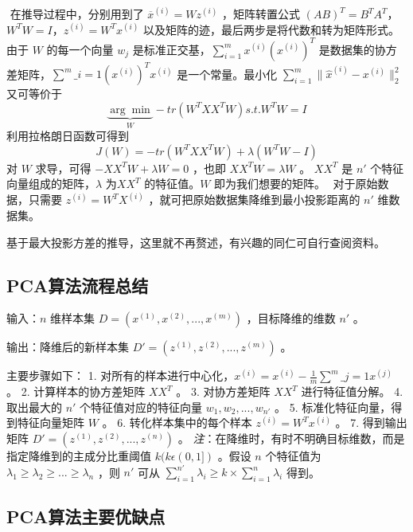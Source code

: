 ​ 在推导过程中，分别用到了 $\overline{x}^{(i)} = Wz^{(i)}$
，矩阵转置公式
$(AB)^T = B^TA^T$，$W^TW = I$，$z^{(i)} = W^Tx^{(i)}$
以及矩阵的迹，最后两步是将代数和转为矩阵形式。 ​ 由于 $W$ 的每一个向量
$w_j$ 是标准正交基，$\sum^m_{i=1} x^{(i)} \left( x^{(i)} \right)^T$
是数据集的协方差矩阵，$\sum^m\_{i=1} \left( x^{(i)}
\right)^T x^{(i)} $ 是一个常量。最小化
$\sum^m_{i=1} \| \hat{x}^{(i)} - x^{(i)} \|^2_2$ 又可等价于 \[
\underbrace{\arg \min}_W - tr \left( W^TXX^TW \right) s.t.W^TW = I
\] 利用拉格朗日函数可得到 \[
J(W) = -tr(W^TXX^TW) + \lambda(W^TW - I)
\] ​ 对 $W$ 求导，可得 $-XX^TW + \lambda W = 0 $ ，也即 $
XX^TW = \lambda W $ 。 $ XX^T $ 是 $ n' $
个特征向量组成的矩阵，$\lambda$ 为$ XX^T $ 的特征值。$W$
即为我们想要的矩阵。 ​ 对于原始数据，只需要 $z^{(i)} = W^TX^{(i)}$
，就可把原始数据集降维到最小投影距离的 $n'$ 维数据集。

​ 基于最大投影方差的推导，这里就不再赘述，有兴趣的同仁可自行查阅资料。

\subsection{PCA算法流程总结}\label{pcaux7b97ux6cd5ux6d41ux7a0bux603bux7ed3}

输入：$n​$ 维样本集
$D = \left( x^{(1)},x^{(2)},...,x^{(m)} \right)​$ ，目标降维的维数
$n'​$ 。

输出：降维后的新样本集
$D' = \left( z^{(1)},z^{(2)},...,z^{(m)} \right)$ 。

主要步骤如下： 1. 对所有的样本进行中心化，$ x^{(i)} = x^{(i)}
- \frac{1}{m} \sum^m\_{j=1} x^{(j)} $ 。 2.
计算样本的协方差矩阵 $XX^T​$ 。 3. 对协方差矩阵 $XX^T$
进行特征值分解。 4. 取出最大的 $n' $ 个特征值对应的特征向量
${ w_1,w_2,...,w_{n'} }$ 。 5. 标准化特征向量，得到特征向量矩阵
$W$ 。 6. 转化样本集中的每个样本 $z^{(i)} = W^T x^{(i)}$ 。 7.
得到输出矩阵 $D' = \left( z^{(1)},z^{(2)},...,z^{(n)} \right)​$ 。
\emph{注}：在降维时，有时不明确目标维数，而是指定降维到的主成分比重阈值
$k(k \epsilon(0,1])​$ 。假设 $n​$ 个特征值为
$\lambda_1 \geqslant \lambda_2 \geqslant ... \geqslant \lambda_n​$
，则 $n'​$ 可从
$\sum^{n'}_{i=1} \lambda_i \geqslant k \times \sum^n_{i=1} \lambda_i ​$
得到。

\subsection{PCA算法主要优缺点}\label{pcaux7b97ux6cd5ux4e3bux8981ux4f18ux7f3aux70b9}

